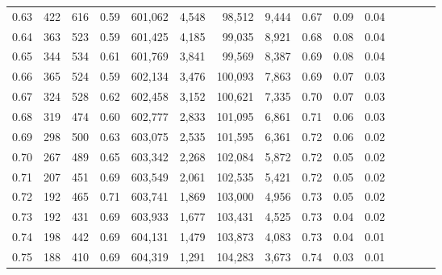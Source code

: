 \begin{tabular}{rrrcrrrrrrrrrrr}
0.63 &     422 &    616 &                                       0.59 &  601,062 &    4,548 &   98,512 &    9,444 &  0.67 &  0.09 &                         0.04 \\
0.64 &     363 &    523 &                                       0.59 &  601,425 &    4,185 &   99,035 &    8,921 &  0.68 &  0.08 &                         0.04 \\
0.65 &     344 &    534 &                                       0.61 &  601,769 &    3,841 &   99,569 &    8,387 &  0.69 &  0.08 &                         0.04 \\
0.66 &     365 &    524 &                                       0.59 &  602,134 &    3,476 &  100,093 &    7,863 &  0.69 &  0.07 &                         0.03 \\
0.67 &     324 &    528 &                                       0.62 &  602,458 &    3,152 &  100,621 &    7,335 &  0.70 &  0.07 &                         0.03 \\
0.68 &     319 &    474 &                                       0.60 &  602,777 &    2,833 &  101,095 &    6,861 &  0.71 &  0.06 &                         0.03 \\
0.69 &     298 &    500 &                                       0.63 &  603,075 &    2,535 &  101,595 &    6,361 &  0.72 &  0.06 &                         0.02 \\
0.70 &     267 &    489 &                                       0.65 &  603,342 &    2,268 &  102,084 &    5,872 &  0.72 &  0.05 &                         0.02 \\
0.71 &     207 &    451 &                                       0.69 &  603,549 &    2,061 &  102,535 &    5,421 &  0.72 &  0.05 &                         0.02 \\
0.72 &     192 &    465 &                                       0.71 &  603,741 &    1,869 &  103,000 &    4,956 &  0.73 &  0.05 &                         0.02 \\
0.73 &     192 &    431 &                                       0.69 &  603,933 &    1,677 &  103,431 &    4,525 &  0.73 &  0.04 &                         0.02 \\
0.74 &     198 &    442 &                                       0.69 &  604,131 &    1,479 &  103,873 &    4,083 &  0.73 &  0.04 &                         0.01 \\
0.75 &     188 &    410 &                                       0.69 &  604,319 &    1,291 &  104,283 &    3,673 &  0.74 &  0.03 &                         0.01 \\

\end{tabular}
